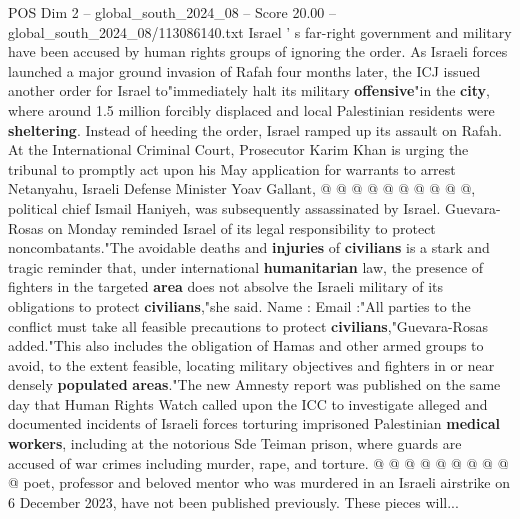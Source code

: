 \begin{textsample}{POS Dim 2 – global\_south\_2024\_08 – Score 20.00 – global\_south\_2024\_08/113086140.txt}
Israel ' s far-right government and military have been accused by human rights groups of ignoring the order.
As Israeli forces launched a major ground invasion of Rafah four months later, the ICJ issued another order for Israel to"immediately halt its military \textbf{offensive}"in the \textbf{city}, where around 1.5 million forcibly displaced and local Palestinian residents were \textbf{sheltering}.
Instead of heeding the order, Israel ramped up its assault on Rafah.
At the International Criminal Court, Prosecutor Karim Khan is urging the tribunal to promptly act upon his May application for warrants to arrest Netanyahu, Israeli Defense Minister Yoav Gallant, @ @ @ @ @ @ @ @ @ @, political chief Ismail Haniyeh, was subsequently assassinated by Israel.
Guevara-Rosas on Monday reminded Israel of its legal responsibility to protect noncombatants."The avoidable deaths and \textbf{injuries} of \textbf{civilians} is a stark and tragic reminder that, under international \textbf{humanitarian} law, the presence of fighters in the targeted \textbf{area} does not absolve the Israeli military of its obligations to protect \textbf{civilians},"she said.
Name : Email :"All parties to the conflict must take all feasible precautions to protect \textbf{civilians},"Guevara-Rosas added."This also includes the obligation of Hamas and other armed groups to avoid, to the extent feasible, locating military objectives and fighters in or near densely \textbf{populated} \textbf{areas}."The new Amnesty report was published on the same day that Human Rights Watch called upon the ICC to investigate alleged and documented incidents of Israeli forces torturing imprisoned Palestinian \textbf{medical} \textbf{workers}, including at the notorious Sde Teiman prison, where guards are accused of war crimes including murder, rape, and torture. @ @ @ @ @ @ @ @ @ @ poet, professor and beloved mentor who was murdered in an Israeli airstrike on 6 December 2023, have not been published previously.
These pieces will...

\end{textsample}
